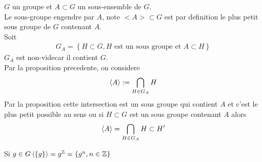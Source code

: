 \documentclass[../main.tex]{subfiles}
\begin{document}
\begin{defn}\label{defn:sous_groupe_engendre}
	$G$ un groupe et $A\subset G$ un sous-ensemble de $G$.\\
	Le sous-groupe engendre par $A$, note $<A> \subset G$ est par definition le plus petit sous groupe de $G$ contenant $A$.\\
	Soit
	\begin{align*}
	G_A =
	\left\{  H \subset G, H \text{ est un sous groupe et  } A \subset H \right\} 
	\end{align*}
	$G_A$ est non-videcar il contient $G$.\\
	Par la proposition precedente, on considere
	\[ 
		\left\langle A\right\rangle := \bigcap_{H\in G_A} H
	\]
	Par la proposition cette intersection est un sous groupe qui contient $A$ et c'est le plus petit possible au sens ou si $H \subset G$ est un sous groupe contenant $A$ alors
	\[ 
		\left\langle A\right\rangle =\bigcap_{H \in G_A}H \subset H'
	\]
\end{defn}
\begin{exemple}
Si $g\in G \left\langle\{g\}\right\rangle = g ^{\mathbb{Z}} = \{g^{n}, n\in \mathbb{Z}\}$
\end{exemple}
\end{document}
